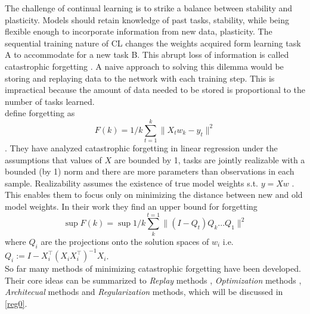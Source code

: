 The challenge of continual learning is to strike a balance between stability and plasticity. Models should retain knowledge of past tasks, stability, while being flexible enough to incorporate information from new data, plasticity. The sequential training nature of CL changes the weights acquired form learning task A to accommodate for a new task B. This abrupt loss of information is called catastrophic forgetting \cite{FRENCH1999128, Mcclelland1995, MCCLOSKEY1989109, Ratcliff1990ConnectionistMO}. A naive approach to solving this dilemma would be storing and replaying data to the network with each training step. This is impractical because the amount of data needed to be stored is proportional to the number of tasks learned.\\
\citeauthor{evron2022} define forgetting as
\begin{equation}
	F(k) = 1/k \sum_{t=1}^{k}\lVert X_t w_k - y_t \rVert^2
\end{equation}.
They have analyzed catastrophic forgetting in linear regression under the assumptions that values of $X$ are bounded by 1, tasks are jointly realizable with a bounded (by 1) norm and there are more parameters than observations in each sample. Realizability assumes the existence of true model weights s.t. $y =Xw$ \cite{Shalev-Shwartz}. This enables them to focus only on minimizing the distance between new and old model weights. In their work they find an upper bound for forgetting
\begin{equation}
	\sup F(k) = \sup 1/k \sum_{k}^{t=1}\lVert(I-Q_t)Q_k ... Q_1\rVert^2
\end{equation}
where $Q_i$ are the projections onto the solution spaces of $w_i$ i.e. $Q_i := I - X_i^\top(X_i X_i^\top)^{-1} X_i$.\\
So far many methods of minimizing catastrophic forgetting have been developed. Their core ideas can be summarized to \textit{Replay} methods \cite{chaudhry2019,rebuffi2017icarlincrementalclassifierrepresentation, aljundi2019gradientbasedsampleselection}, \textit{Optimization} methods \cite{lopezpaz2022gradientepisodicmemorycontinual, javed2019metalearningrepresentationscontinuallearning, mirzadeh2020understandingroletrainingregimes}, \textit{Architecual} methods \cite{mallya2018piggybackadaptingsinglenetwork, ebrahimi2020adversarialcontinuallearning, fernando2017pathnetevolutionchannelsgradient} and \textit{Regularization} methods, which will be discussed in \autoref{reg0}. 
